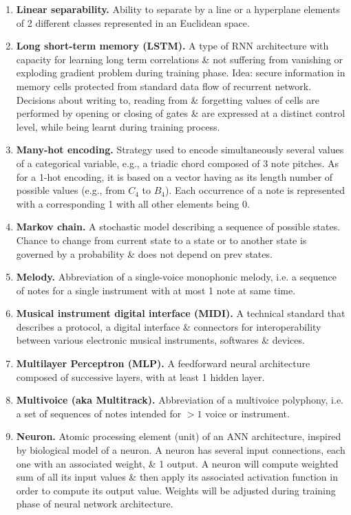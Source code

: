 \documentclass{article}
\begin{document}
\begin{itemize}
\begin{enumerate}
		\item {\bf Linear separability.} Ability to separate by a line or a hyperplane elements of 2 different classes represented in an Euclidean space.
		\item {\bf Long short-term memory (LSTM).} A type of RNN architecture with capacity for learning long term correlations \& not suffering from vanishing or exploding gradient problem during training phase. Idea: secure information in memory cells protected from standard data flow of recurrent network. Decisions about writing to, reading from \& forgetting values of cells are performed by opening or closing of gates \& are expressed at a distinct control level, while being learnt during training process.
		\item {\bf Many-hot encoding.} Strategy used to encode simultaneously several values of a categorical variable, e.g., a triadic chord composed of 3 note pitches. As for a 1-hot encoding, it is based on a vector having as its length number of possible values (e.g., from $C_4$ to $B_4$). Each occurrence of a note is represented with a corresponding 1 with all other elements being 0.
		\item {\bf Markov chain.} A stochastic model describing a sequence of possible states. Chance to change from current state to a state or to another state is governed by a probability \& does not depend on prev states.
		\item {\bf Melody.} Abbreviation of a single-voice monophonic melody, i.e. a sequence of notes for a single instrument with at most 1 note at same time.
		\item {\bf Musical instrument digital interface (MIDI).} A technical standard that describes a protocol, a digital interface \& connectors for interoperability between various electronic musical instruments, softwares \& devices.
		\item {\bf Multilayer Perceptron (MLP).} A feedforward neural architecture composed of successive layers, with at least 1 hidden layer.
		\item {\bf Multivoice (aka Multitrack).} Abbreviation of a multivoice polyphony, i.e. a set of sequences of notes intended for $> 1$ voice or instrument.
		\item {\bf Neuron.} Atomic processing element (unit) of an ANN architecture, inspired by biological model of a neuron. A neuron has several input connections, each one with an associated weight, \& 1 output. A neuron will compute weighted sum of all its input values \& then apply its associated activation function in order to compute its output value. Weights will be adjusted during training phase of neural network architecture.

\end{enumerate}
\end{itemize}
\end{document}

